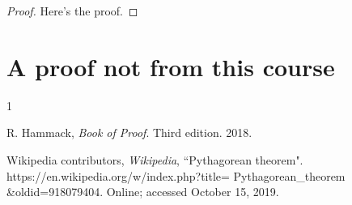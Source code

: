 \documentclass[12pt]{article} %
\theoremstyle{definition}
\begin{document}
\begin{proof}
    Here's the proof.
\end{proof}


\section{A proof not from this course}



\begin{thebibliography}{1}

 R. Hammack, \textit{Book of Proof}.
  Third edition. 2018.

 Wikipedia contributors,
\textit{Wikipedia},
``Pythagorean theorem".
https://en.wikipedia.org/w/index.php?title=
Pythagorean\_theorem  \\
\&oldid=918079404.
Online; accessed October 15, 2019.


  \end{thebibliography}
\end{document}
